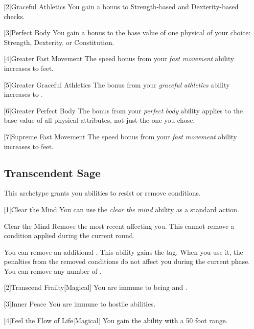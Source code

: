         [2]{Graceful Athletics} You gain a  bonus to Strength-based and Dexterity-based checks.

        [3]{Perfect Body} You gain a  bonus to the base value of one physical  of your choice: Strength, Dexterity, or Constitution.

        [4]{Greater Fast Movement} The speed bonus from your \textit{fast movement} ability increases to  feet.

        [5]{Greater Graceful Athletics} The bonus from your \textit{graceful athletics} ability increases to .

        [6]{Greater Perfect Body} The bonus from your \textit{perfect body} ability applies to the base value of all physical attributes, not just the one you chose.

        [7]{Supreme Fast Movement} The speed bonus from your \textit{fast movement} ability increases to  feet.

    \subsection{Transcendent Sage}
        This archetype grants you abilities to resist or remove conditions.

        [1]{Clear the Mind} You can use the \textit{clear the mind} ability as a standard action.
        \begin{freeability}{Clear the Mind}
            Remove the most recent  affecting you.
            This cannot remove a condition applied during the current round.

            \rankline
             You can remove an additional .
             This ability gains the  tag.
            When you use it, the penalties from the removed conditions do not affect you during the current phase.
             You can remove any number of .
        \end{freeability}

        [2]{Transcend Frailty}[Magical]
        You are immune to being  and .

        [3]{Inner Peace} You are immune to hostile  abilities.

        [4]{Feel the Flow of Life}[Magical] You gain the  ability with a 50 foot range.

